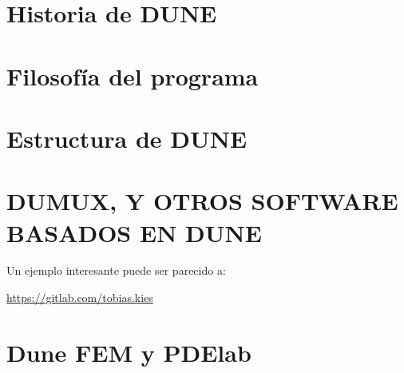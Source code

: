 \section{Historia de DUNE}
\section{Filosofía del programa}
\section{Estructura de DUNE}
\section{DUMUX, Y OTROS SOFTWARE BASADOS EN DUNE} %

Un ejemplo interesante puede ser parecido a:

\url{https://gitlab.com/tobias.kies}

\section{Dune FEM y PDElab}